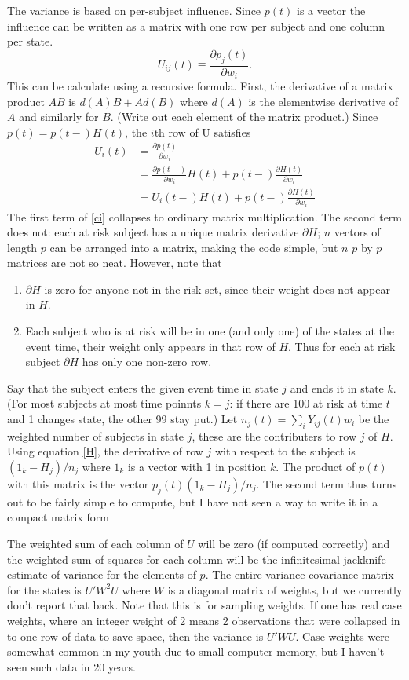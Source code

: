 \documentclass{article}
\begin{document}
The variance is based on per-subject influence.  Since $p(t)$ is a vector
the influence can be written as a matrix with one row per subject and
one column per state.
$$ U_{ij}(t) \equiv \frac{\partial p_j(t)}{\partial w_i}. $$
This can be calculate using a recursive formula.
First, the derivative of a matrix product $AB$ is $d(A)B + Ad(B)$ where
$d(A)$ is the elementwise derivative of $A$ and similarly for $B$.
(Write out each element of the matrix product.)
Since $p(t) = p(t-)H(t)$, the $i$th row of U satisfies
\begin{align}
  U_i(t) &= \frac{\partial p(t)}{\partial w_i} \nonumber \\
         &= \frac{\partial p(t-)}{\partial w_i} H(t) + 
           p(t-) \frac{\partial H(t)}{\partial w_i} \nonumber \\
         &= U_i(t-) H(t) +  p(t-) \frac{\partial H(t)}{\partial w_i} 
           \label{ci}
\end{align}  
The first term of \ref{ci} collapses to ordinary matrix multiplication. 
The second term does not: each at risk subject has a unique matrix derivative
$\partial H$; $n$ vectors of length $p$ can be arranged into a matrix, making
the code simple, but $n$
$p$ by $p$ matrices are not so neat.
However, note that
\begin{enumerate}
\item $\partial H$ is zero for anyone not in the risk set, since their
  weight does not appear in $H$.
\item Each subject who is at risk will be in one (and only one) of the
  states at the event time, their weight only appears in that row of $H$.
  Thus for each at risk subject $\partial H$ has only one non-zero row.
\end{enumerate}
Say that the subject enters the given event time in state $j$ and ends it
in state $k$.
(For most subjects at most time poinnts $k=j$: if there are 100 at risk at 
time $t$ and 1 changes state, the other 99 stay put.)
Let $n_j(t)= \sum_i Y_{ij}(t)w_i$ be the weighted number of subjects
in state $j$, these are the contributers to row $j$ of $H$.
Using equation \ref{H}, the derivative of row $j$
with respect to the subject is $(1_k - H_j)/n_j$
where $1_k$ is a vector with 1 in position $k$.
The product of $p(t)$ with this matrix is the vector
$p_j(t)(1_k - H_j)/n_j$.
The second term thus turns out to be fairly simple to compute, but I have
not seen a way to write it in a compact matrix form

The weighted sum of each column of $U$ will be zero (if computed correctly)
and the weighted sum of squares for each column will be the infinitesimal
jackknife estimate of variance for the elements of $p$.
The entire variance-covariance matrix for the states is $U'W^2U$ where 
$W$ is a diagonal 
matrix of weights, but we currently don't report that back.
Note that this is for sampling weights.  
If one has real case weights, where an integer weight of 2 means 2 observations
that were collapsed in to one row of data to save space, then the
variance is $U'WU$.  
Case weights were somewhat common in my youth due to small computer memory,
but I haven't seen such data in 20 years.
\end{document}

